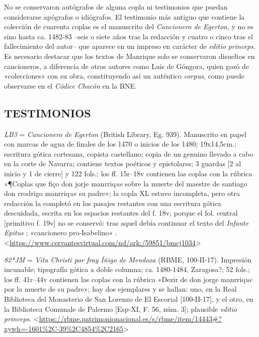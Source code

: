 \documentclass[11pt,a4paper,twoside]{article}
\newcommand{\comillas}[1]{«#1»}
\newcommand{\eg}{{\emph{LB3}}}
\newcommand{\jm}{\emph{82*JM}}
\begin{document}
%
No se conservaron autógrafos de alguna copla ni testimonios que puedan considerarse apógrafos o idiógrafos. El testimonio más antiguo que contiene la colección de cuarenta coplas es el manuscrito del \emph{Cancionero de Egerton}, y no es sino hasta ca. 1482-83 --seis o siete años tras la redacción y cuatro o cinco tras el fallecimiento del autor-- que aparece en un impreso en carácter de \emph{editio princeps}. Es necesario destacar que los textos de Manrique solo se conservaron disueltos en cancioneros, a diferencia de otros autores como Luis de Góngora, quien gozó de \comillas{colecciones} con su obra, constituyendo así un auténtico \emph{corpus}, como puede observarse en el \emph{Códice Chacón} en la BNE.\par

\subsection*{\centering\normalsize TESTIMONIOS}

{\eg} = \emph{Cancionero de Egerton} (British Library, Eg. 939).
%
Manuscrito en papel con marcas de agua de finales de los 1470 o inicios de los 1480; 19x14,5cm.; escritura gótica cortesana, copista castellano; copia de un genuino llevado a cabo en la corte de Navarra; contiene textos poéticos y epistolares; 3 guardas [2 al inicio y 1 de cierre] y 122 fols.; los ff. 15r--18v contienen las coplas con la rúbrica \comillas{¶Coplas que fiço don jorje manrriq\emph{ue} sobre la muerte del maestre de santiago don rrodrigo manrriq\emph{ue} su padre}; la copla XL estuvo incompleta, pero otra redacción la completó en los pasajes restantes con una escritura gótica descuidada, escrita en los espacios restantes del f. 18v, porque el fol. central [primitivo f. 19v] no se conservó: tras aquel debía continuar el texto del \emph{Infante Epitus} \textcite{Beltrán2011}; \comillas{cancionero pro-Isabelino} \parencite{Severin2000}. <\url{https://www.cervantesvirtual.com/nd/ark:/59851/bmcj1034}>\par

{\jm} = \emph{Vita Christi por fray Íñigo de Mendoza} (RBME, 100-II-17).
%
Impresión incunable; tipografía gótica a doble columna; ca. 1480-1484, Zaragosa?; 52 fols.; los ff. 41r--44v contienen las coplas con la rúbrica \comillas{Dezir de don jorge manrriq\emph{ue} por la muerte de su padre}; hay dos ejemplares y se hallan: uno, en la Real Biblioteca del Monasterio de San Lorenzo de El Escorial [100-II-17], y el otro, en la Biblioteca Comunale de Palermo [Esp-XI, F. 56, núm. 3]; plausible \emph{editio princeps}. <\url{https://rbme.patrimonionacional.es/s/rbme/item/14443#?xywh=-1601%2C-39%2C4854%2C2165}>\par
\end{document}
